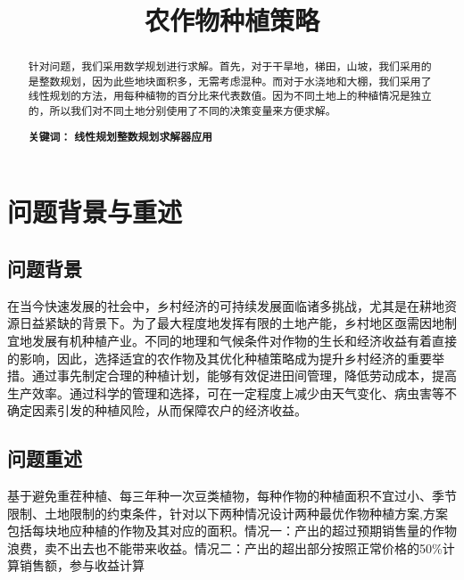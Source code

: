 \documentclass[a4paper]{article}
\title{农作物种植策略}
\date{} %
\begin{document}
	\maketitle
	\vspace{-6em} %
	\begin{abstract}
		
		\hspace{0.2em}
		\textbf{}针对问题，我们采用数学规划进行求解。首先，对于干旱地，梯田，山坡，我们采用的是整数规划，因为此些地块面积多，无需考虑混种。而对于水浇地和大棚，我们采用了线性规划的方法，用每种植物的百分比来代表数值。因为不同土地上的种植情况是独立的，所以我们对不同土地分别使用了不同的决策变量来方便求解。
		
	
		{\textbf{关键词：} \textbf{线性规划}\quad   \textbf{整数规划}\quad \textbf{求解器应用}\quad}
	\end{abstract}
	
	
	\section{问题背景与重述}
	\subsection{问题背景}
	
    在当今快速发展的社会中，乡村经济的可持续发展面临诸多挑战，尤其是在耕地资源日益紧缺的背景下。为了最大程度地发挥有限的土地产能，乡村地区亟需因地制宜地发展有机种植产业。不同的地理和气候条件对作物的生长和经济收益有着直接的影响，因此，选择适宜的农作物及其优化种植策略成为提升乡村经济的重要举措。通过事先制定合理的种植计划，能够有效促进田间管理，降低劳动成本，提高生产效率。通过科学的管理和选择，可在一定程度上减少由天气变化、病虫害等不确定因素引发的种植风险，从而保障农户的经济收益。
	
	\subsection{问题重述}
	基于避免重茬种植、每三年种一次豆类植物，每种作物的种植面积不宜过小、季节限制、土地限制的约束条件，针对以下两种情况设计两种最优作物种植方案,方案包括每块地应种植的作物及其对应的面积。情况一：产出的超过预期销售量的作物浪费，卖不出去也不能带来收益。情况二：产出的超出部分按照正常价格的50\%计算销售额，参与收益计算
	
\end{document}

